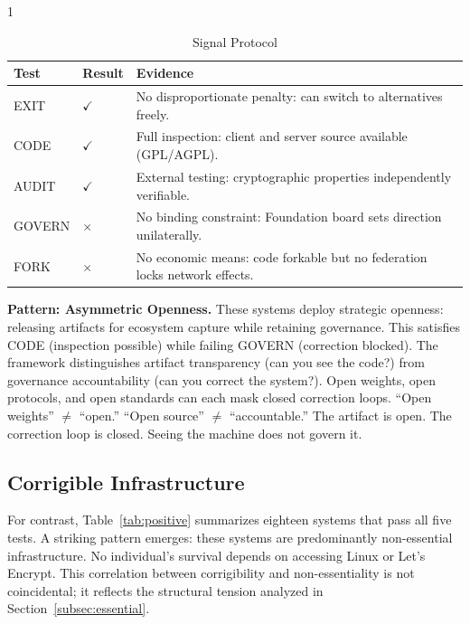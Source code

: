 \begin{table}[htbp]
    \begin{subtable}{1\textwidth}
        \centering
        \caption{Signal Protocol}
        \small
        \begin{tabular}{@{}llp{8.5cm}@{}}
            \toprule
            \textbf{Test} & \textbf{Result} & \textbf{Evidence} \\
            \midrule
            EXIT & $\checkmark$ & No disproportionate penalty: can switch to alternatives freely. \\
            CODE & $\checkmark$ & Full inspection: client and server source available (GPL/AGPL). \\
            AUDIT & $\checkmark$ & External testing: cryptographic properties independently verifiable. \\
            GOVERN & $\times$ & No binding constraint: Foundation board sets direction unilaterally. \\
            FORK & $\times$ & No economic means: code forkable but no federation locks network effects. \\
            \bottomrule
        \end{tabular}
    \end{subtable}
\end{table}

\textbf{Pattern: Asymmetric Openness.} These systems deploy strategic openness: releasing artifacts for ecosystem capture while retaining governance. This satisfies CODE (inspection possible) while failing GOVERN (correction blocked). The framework distinguishes artifact transparency (can you see the code?) from governance accountability (can you correct the system?). Open weights, open protocols, and open standards can each mask closed correction loops. ``Open weights'' $\neq$ ``open.'' ``Open source'' $\neq$ ``accountable.'' The artifact is open. The correction loop is closed. Seeing the machine does not govern it.

\subsection{Corrigible Infrastructure}

For contrast, Table~\ref{tab:positive} summarizes eighteen systems that pass all five tests. A striking pattern emerges: these systems are predominantly non-essential infrastructure. No individual's survival depends on accessing Linux or Let's Encrypt. This correlation between corrigibility and non-essentiality is not coincidental; it reflects the structural tension analyzed in Section~\ref{subsec:essential}.

